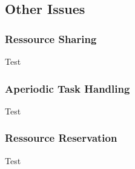 \subsection{Other Issues}
\subsubsection{Ressource Sharing}
\begin{frame}{\subsubsecname}
	Test
\end{frame}

\subsubsection{Aperiodic Task Handling}
\begin{frame}{\subsubsecname}
	Test
\end{frame}

\subsubsection{Ressource Reservation}
\begin{frame}{\subsubsecname}
	Test
\end{frame}
